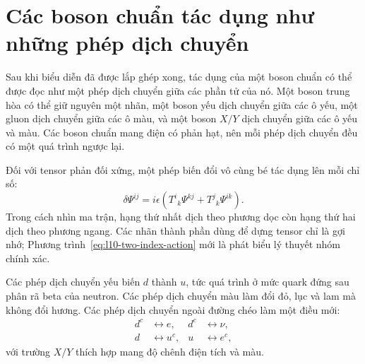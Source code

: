 \begin{classroomqa}
\end{classroomqa}

\section{Các boson chuẩn tác dụng như những phép dịch chuyển}

Sau khi biểu diễn đã được lắp ghép xong, tác dụng của một boson chuẩn có thể được đọc như một phép dịch chuyển giữa các phần tử của nó. Một boson trung hòa có thể giữ nguyên một nhãn, một boson yếu dịch chuyển giữa các ô yếu, một gluon dịch chuyển giữa các ô màu, và một boson \(X/Y\) dịch chuyển giữa các ô yếu và màu. Các boson chuẩn mang điện có phản hạt, nên mỗi phép dịch chuyển đều có một quá trình ngược lại.

Đối với tensor phản đối xứng, một phép biến đổi vô cùng bé tác dụng lên mỗi chỉ số:
\begin{equation}
\delta\Psi^{ij}
=
i\epsilon
\left(
T^i{}_k\Psi^{kj}
+
T^j{}_k\Psi^{ik}
\right).
\label{eq:l10-two-index-action}
\end{equation}
Trong cách nhìn ma trận, hạng thứ nhất dịch theo phương dọc còn hạng thứ hai dịch theo phương ngang. Các nhãn thành phần dùng để dựng tensor chỉ là gợi nhớ; Phương trình~\eqref{eq:l10-two-index-action} mới là phát biểu lý thuyết nhóm chính xác.

Các phép dịch chuyển yếu biến \(d\) thành \(u\), tức quá trình ở mức quark đứng sau phân rã beta của neutron. Các phép dịch chuyển màu làm đổi đỏ, lục và lam mà không đổi hương. Các phép dịch chuyển ngoài đường chéo làm một điều mới:
\begin{equation}
\begin{aligned}
d^c&\longleftrightarrow e,
& d^c&\longleftrightarrow\nu,\\
d&\longleftrightarrow u^c,
& u&\longleftrightarrow e^c,
\end{aligned}
\label{eq:l10-leptoquark-shifts}
\end{equation}
với trường \(X/Y\) thích hợp mang độ chênh điện tích và màu.

